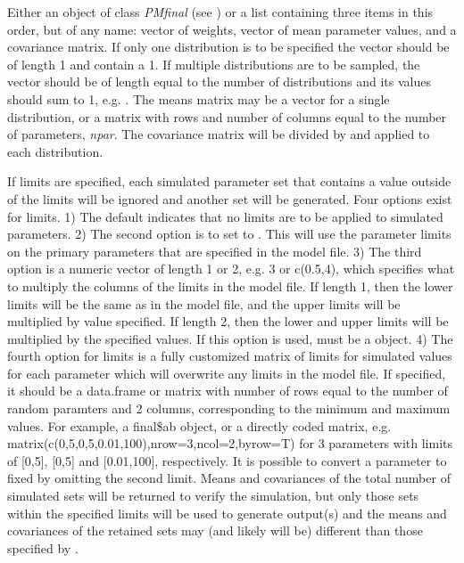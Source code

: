 \documentclass[a4paper]{book}
\begin{document}
\begin{Arguments}
\begin{ldescription}
\item[\code{poppar}] Either an object of class \emph{PMfinal} (see )
or a list containing three items in this order, but of any name: vector of weights, vector of mean parameter values, and a covariance matrix.
If only one distribution is to be specified the  vector should be of length 1 and contain a 1.
If multiple distributions are to be sampled, the  vector should be of length equal to the number
of distributions and its values should sum to 1, e.g. .  The means matrix may be a vector for a single
distribution, or a matrix with  rows and number of columns equal to the number of parameters, \emph{npar}.
The covariance matrix will be divided by  and applied to each distribution.

\item[\code{limits}] If limits are specified, each simulated parameter set that contains a value outside of the limits 
will be ignored and another set will be generated.  Four options exist for limits.  1) The default  
indicates that no limits are to be applied to simulated parameters.   
2) The second option is to set  to . This will use the parameter limits on the 
primary parameters that are specified in the model file.  
3) The third option is a numeric vector of length 1 or 2, e.g. 3 or c(0.5,4), which specifies what to multiply the
columns of the limits in the model file.  If length 1, then the lower limits will be the same as in the model file, and
the upper limits will be multiplied by value specified.  If length 2, then the lower and upper limits will be multiplied
by the specified values.  If this option is used,  must be a  object.
4) The fourth option for limits is a fully customized matrix of limits for simulated values for each parameter which will
overwrite any limits in the model file.  If specified, it should be a data.frame or matrix with number of rows equal to the number
of random paramters and 2 columns, corresponding to the minimum and maximum values.  For example, a final\$ab object, or a directly coded
matrix, e.g. matrix(c(0,5,0,5,0.01,100),nrow=3,ncol=2,byrow=T) for 3 parameters
with limits of [0,5], [0,5] and [0.01,100], respectively.  It is possible to convert a parameter to fixed by omitting
the second limit.   Means and covariances of the total number of simulated sets
will be returned to verify the simulation, but only those sets within the specified limits will be used to generate output(s) and the means and covariances of the
retained sets may (and likely will be) different than those specified by .


\end{ldescription}
\end{Arguments}
\end{document}
